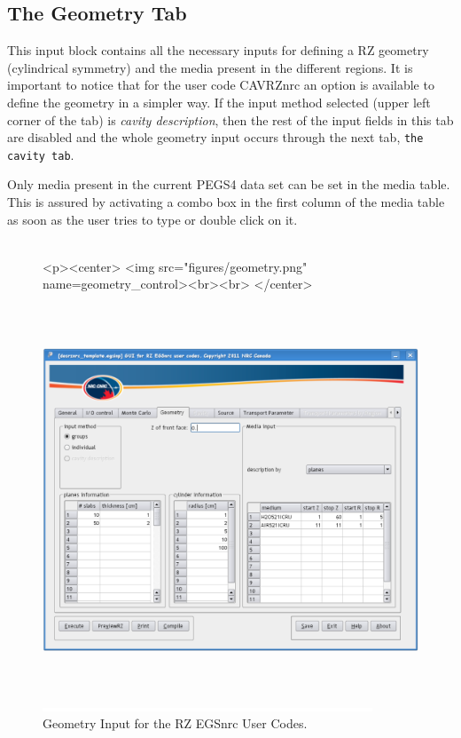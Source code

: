\documentclass[12pt,twoside]{article}   %
\begin{document}
\newpage
\subsection{The Geometry Tab}

This input block contains all the necessary inputs for defining a RZ geometry (cylindrical symmetry)
and the media present in the different regions. It is important to notice that for the user code
CAVRZnrc an option is available to define the geometry in a simpler way. If the input method selected
(upper left corner of the tab) is {\em cavity description}, then the rest of the input fields in this
tab are disabled and the whole geometry input occurs through the next tab, {\tt the cavity tab}.

Only media present in the current PEGS4 data set can be set in the media table. This is assured by
activating a combo box in the first column of the media table as soon as the user tries to type
or double click on it. \\ \\

\begin{figure}[htb]
\begin{htmlonly}
\begin{rawhtml}
<p><center>
<img src="figures/geometry.png" name=geometry_control><br><br>
</center>
\end{rawhtml}
\end{htmlonly}
\begin{latexonly}
\begin{center}
\includegraphics[height=11.56cm]{figures/geometry}
\end{center}
\end{latexonly}
\begin{center}
\includegraphics[height=1mm]{figures/fake2}
\end{center}
\caption{Geometry Input for the RZ EGSnrc User Codes.}
\label{geometry_control}
\end{figure}
\end{document}

